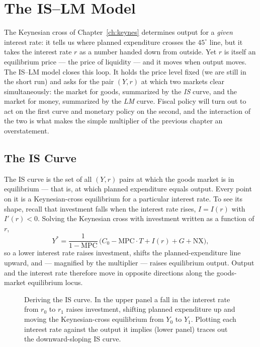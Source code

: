 \chapter{The IS--LM Model}
\label{ch:islm}

The Keynesian cross of Chapter~\ref{ch:keynes} determines output for a \emph{given} interest rate: it tells us where planned expenditure crosses the $45^\circ$ line, but it takes the interest rate $r$ as a number handed down from outside. Yet $r$ is itself an equilibrium price --- the price of liquidity --- and it moves when output moves. The IS--LM model closes this loop. It holds the price level fixed (we are still in the short run) and asks for the pair $(Y,r)$ at which two markets clear simultaneously: the market for goods, summarized by the \emph{IS} curve, and the market for money, summarized by the \emph{LM} curve. Fiscal policy will turn out to act on the first curve and monetary policy on the second, and the interaction of the two is what makes the simple multiplier of the previous chapter an overstatement.

\section{The IS Curve}

The IS curve is the set of all $(Y,r)$ pairs at which the goods market is in equilibrium --- that is, at which planned expenditure equals output. Every point on it is a Keynesian-cross equilibrium for a particular interest rate. To see its shape, recall that investment falls when the interest rate rises, $I=I(r)$ with $I'(r)<0$. Solving the Keynesian cross with investment written as a function of $r$,
\[
Y^{*} = \frac{1}{1-\mathrm{MPC}}\,\big(C_0 - \mathrm{MPC}\cdot T + I(r) + G + \mathrm{NX}\big),
\]
so a lower interest rate raises investment, shifts the planned-expenditure line upward, and --- magnified by the multiplier --- raises equilibrium output. Output and the interest rate therefore move in opposite directions along the goods-market equilibrium locus.

\begin{figure}[h]
\centering

\caption{Deriving the IS curve. In the upper panel a fall in the interest rate from $r_0$ to $r_1$ raises investment, shifting planned expenditure up and moving the Keynesian-cross equilibrium from $Y_0$ to $Y_1$. Plotting each interest rate against the output it implies (lower panel) traces out the downward-sloping IS curve.}
\label{fig:macro-15}
\end{figure}

